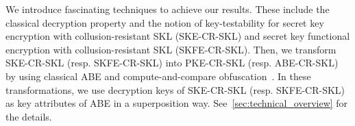 We introduce fascinating techniques to achieve our results. These
include the classical decryption property and the notion of key-testability for secret key encryption with collusion-resistant SKL (SKE-CR-SKL) and secret key functional encryption with collusion-resistant SKL (SKFE-CR-SKL). Then, we transform SKE-CR-SKL (resp. SKFE-CR-SKL) into PKE-CR-SKL (resp. ABE-CR-SKL) by using classical ABE and compute-and-compare obfuscation~\cite{FOCS:WicZir17,FOCS:GoyKopWat17}. In these transformations, we use decryption keys of SKE-CR-SKL (resp. SKFE-CR-SKL) as key attributes of ABE in a superposition way.
See~\cref{sec:technical_overview} for the details.

\begin{table*}[!t]
\setlength{}
\begin{center}
\begin{minipage}[c]{\textwidth} \scriptsize
\begin{center}
 \begin{threeparttable}




\end{threeparttable}
\end{center}
\end{minipage}
\end{center}
\end{table*}

